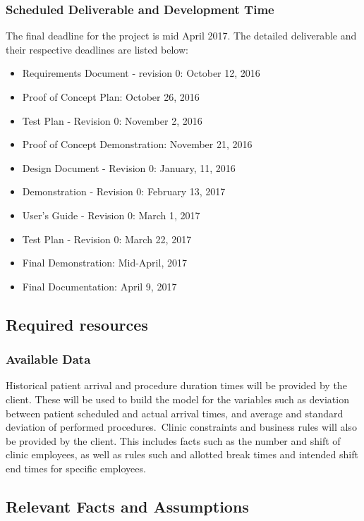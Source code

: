 \documentclass[12pt, titlepage]{article}
\begin{document}
\subsubsection{Scheduled Deliverable and Development Time}
The final deadline for the project is mid April 2017. The detailed deliverable and their respective deadlines are listed below:
\begin{itemize}
  \item Requirements Document - revision 0: October 12, 2016 
  \item Proof of Concept Plan: October 26, 2016
  \item Test Plan - Revision 0: November 2, 2016
  \item Proof of Concept Demonstration: November 21, 2016
  \item Design Document - Revision 0: January, 11, 2016
  \item Demonstration - Revision 0: February 13, 2017
  \item User’s Guide - Revision 0: March 1, 2017
  \item Test Plan - Revision 0: March 22, 2017
  \item Final Demonstration: Mid-April, 2017
  \item Final Documentation: April 9, 2017
\end{itemize}

\subsection{Required resources}
\subsubsection{Available Data}
Historical patient arrival and procedure duration times will be provided by the client. These will be used to build the model for the variables such as deviation between patient scheduled and actual arrival times, and average and standard deviation of performed procedures.\newline\
Clinic constraints and business rules will also be provided by the client. This includes facts such as the number and shift of clinic employees, as well as rules such and allotted break times and intended shift end times for specific employees.
\newline

\subsection{Relevant Facts and Assumptions} 
\end{document}
